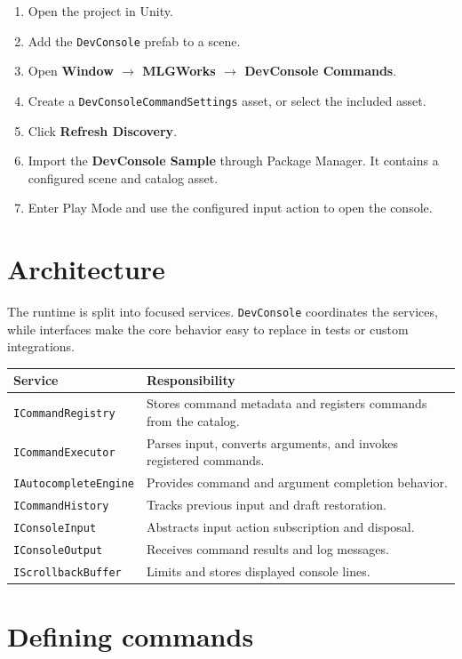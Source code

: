 \documentclass[11pt,a4paper]{article}
\begin{document}
\begin{enumerate}[leftmargin=*]
  \item Open the project in Unity.
  \item Add the \texttt{DevConsole} prefab to a scene.
  \item Open \textbf{Window $\rightarrow$ MLGWorks $\rightarrow$ DevConsole Commands}.
  \item Create a \texttt{DevConsoleCommandSettings} asset, or select the included asset.
  \item Click \textbf{Refresh Discovery}.
  \item Import the \textbf{DevConsole Sample} through Package Manager. It contains a configured scene and catalog asset.
  \item Enter Play Mode and use the configured input action to open the console.
\end{enumerate}

\section{Architecture}

The runtime is split into focused services. \texttt{DevConsole} coordinates the services, while interfaces make the core behavior easy to replace in tests or custom integrations.

\begin{longtable}{p{}p{}}
\toprule
\textbf{Service} & \textbf{Responsibility} \\
\midrule
\endhead
\texttt{ICommandRegistry} & Stores command metadata and registers commands from the catalog. \\
\texttt{ICommandExecutor} & Parses input, converts arguments, and invokes registered commands. \\
\texttt{IAutocompleteEngine} & Provides command and argument completion behavior. \\
\texttt{ICommandHistory} & Tracks previous input and draft restoration. \\
\texttt{IConsoleInput} & Abstracts input action subscription and disposal. \\
\texttt{IConsoleOutput} & Receives command results and log messages. \\
\texttt{IScrollbackBuffer} & Limits and stores displayed console lines. \\
\bottomrule
\end{longtable}

\section{Defining commands}
\end{document}
